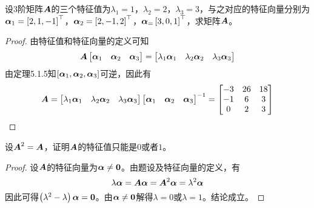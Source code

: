 \begin{problem}
设\(3\)阶矩阵\(\boldsymbol{A}\)的三个特征值为\(\lambda_1=1\)，\(\lambda_2=2\)，\(\lambda_3=3\)，与之对应的特征向量分别为\(\boldsymbol{\alpha}_1=\left[ 2,1,-1 \right]^\top\)，\(\boldsymbol{\alpha}_2=\left[ 2,-1,2 \right]^\top\)，\(\boldsymbol{\alpha}_=\left[ 3,0,1 \right]^\top\)，求矩阵\(\boldsymbol{A}\)。
\end{problem}
\begin{proof}
    由特征值和特征向量的定义可知
    \begin{equation*}
        \boldsymbol{A}\begin{bmatrix}\boldsymbol{\alpha}_1&\boldsymbol{\alpha}_2&\boldsymbol{\alpha}_3\end{bmatrix}=\begin{bmatrix}\lambda_1\boldsymbol{\alpha}_1&\lambda_2\boldsymbol{\alpha}_2&\lambda_3\boldsymbol{\alpha}_3\end{bmatrix}
    \end{equation*}
    由定理5.1.5知\(\left[ \boldsymbol{\alpha}_1,\boldsymbol{\alpha}_2,\boldsymbol{\alpha}_3 \right]\)可逆，因此有
    \begin{equation*}
        \boldsymbol{A}=\begin{bmatrix}\lambda_1\boldsymbol{\alpha}_1&\lambda_2\boldsymbol{\alpha}_2&\lambda_3\boldsymbol{\alpha}_3\end{bmatrix}{\begin{bmatrix}\boldsymbol{\alpha}_1&\boldsymbol{\alpha}_2&\boldsymbol{\alpha}_3\end{bmatrix}}^{-1}=
        \begin{bmatrix}
            -3 & 26 & 18 \\
            -1 & 6  & 3  \\
            0  & 2  & 3
        \end{bmatrix}
    \end{equation*}
\end{proof}

\begin{problem}
设\(\boldsymbol{A}^2=\boldsymbol{A}\)，证明\(\boldsymbol{A}\)的特征值只能是\(0\)或者\(1\)。
\end{problem}
\begin{proof}
    设\(\boldsymbol{A}\)的特征向量为\(\boldsymbol{\alpha}\neq\boldsymbol{0}\)。由题设及特征向量的定义，有
    \begin{equation*}
        \lambda\boldsymbol{\alpha}=\boldsymbol{A}\boldsymbol{\alpha}=\boldsymbol{A}^2\boldsymbol{\alpha}=\lambda^2\boldsymbol{\alpha}
    \end{equation*}
    因此可得\(\left( \lambda^2-\lambda \right)\boldsymbol{\alpha}=\boldsymbol{0}\)。由\(\boldsymbol{\alpha}\neq\boldsymbol{0}\)解得\(\lambda=0\)或\(\lambda=1\)。结论成立。
\end{proof}

